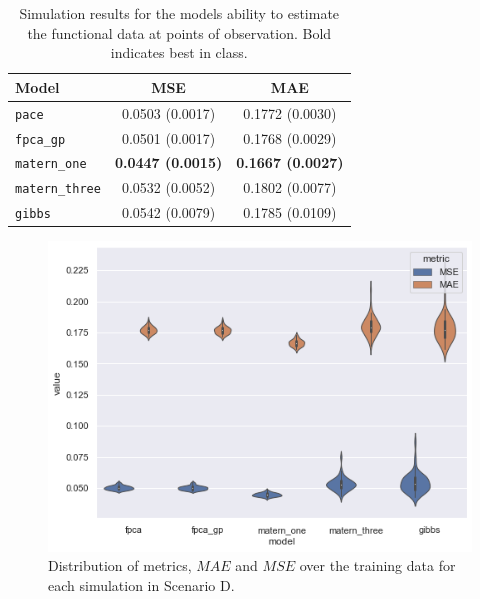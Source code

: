 \begin{table}[b]
	\caption[Simulation results for Scenario D on observed data]{Simulation results for the models ability to estimate the functional data at points of observation. Bold indicates best in class.}
	\centering
	\label{tab:train_D}
	\begin{tabular}{lcc}
		\toprule
		\textbf{Model} & \textbf{MSE} & \textbf{MAE} \\
		\midrule
		\verb*|pace| & 0.0503 (0.0017)& 0.1772 (0.0030)\\
		\verb*|fpca_gp| & 0.0501 (0.0017) & 0.1768	(0.0029) \\
		\verb*|matern_one| & \textbf{0.0447	(0.0015)} & \textbf{0.1667 (0.0027)} \\
		\verb*|matern_three| & 0.0532 (0.0052)& 0.1802 (0.0077) \\
		\verb*|gibbs| & 0.0542 (0.0079) & 0.1785 (0.0109)\\
		\bottomrule
	\end{tabular}
\end{table}

\begin{figure}
	\centering
	\includegraphics[width=\textwidth]{train_D_dist}
	\caption[Distribution of metrics, $MAE$ and $MSE$ over the training data for each simulation in Scenario D.]{Distribution of metrics, $MAE$ and $MSE$ over the training data for each simulation in Scenario D.}
	\label{fig:train_D_dist}
\end{figure}

